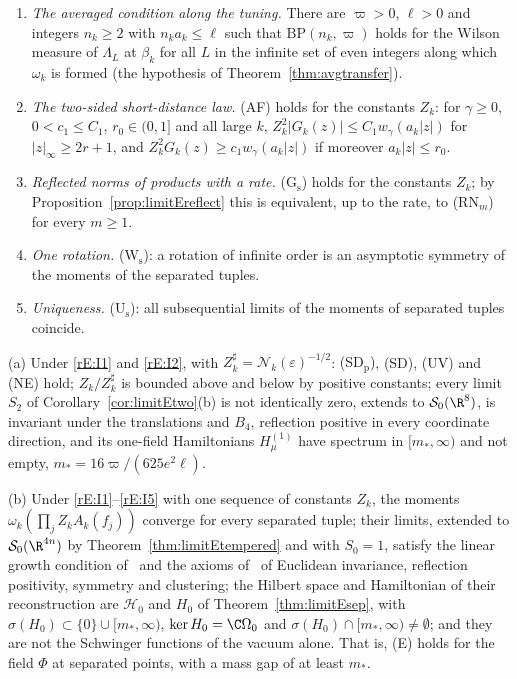 \begin{enumerate}[label=\textup{(I\arabic*)},leftmargin=*]
\item\label{rE:I1} \emph{The averaged condition along the tuning.} There
are $\varpi>0$, $\ell>0$ and integers $n_k\ge2$ with $n_ka_k\le\ell$ such
that $\mathrm{BP}(n_k,\varpi)$ holds for the Wilson measure of $\Lambda_L$
at $\beta_k$ for all $L$ in the infinite set of even integers along which
$\omega_k$ is formed (the hypothesis of Theorem~\ref{thm:avgtransfer}).
\item\label{rE:I2} \emph{The two-sided short-distance law.} (AF) holds for
the constants $Z_k$: for $\gamma\ge0$, $0<c_1\le C_1$, $r_0\in(0,1]$ and all
large $k$, $Z_k^2|G_k(z)|\le C_1w_\gamma(a_k|z|)$ for $|z|_\infty\ge2r+1$, and
$Z_k^2G_k(z)\ge c_1w_\gamma(a_k|z|)$ if moreover $a_k|z|\le r_0$.
\item\label{rE:I3} \emph{Reflected norms of products with a rate.}
(G$_{\mathrm s}$) holds for the constants $Z_k$; by
Proposition~\ref{prop:limitEreflect} this is equivalent, up to the rate, to
(RN$_m$) for every $m\ge1$.
\item\label{rE:I4} \emph{One rotation.} (W$_{\mathrm s}$): a rotation of
infinite order is an asymptotic symmetry of the moments of the separated
tuples.
\item\label{rE:I5} \emph{Uniqueness.} (U$_{\mathrm s}$): all subsequential
limits of the moments of separated tuples coincide.
\end{enumerate}

\begin{theorem}\label{rE:suffices}
\textup{(a)} Under \textup{\ref{rE:I1}} and \textup{\ref{rE:I2}}, with
$Z^\sharp_k=\mathcal N_k(\varepsilon)^{-1/2}$: \textup{(SD$_{\mathrm p}$)},
\textup{(SD)}, \textup{(UV)} and \textup{(NE)} hold; $Z_k/Z^\sharp_k$ is
bounded above and below by positive constants; every limit $S_2$ of
Corollary~\textup{\ref{cor:limitEtwo}(b)} is not identically zero, extends
to $\mathcal S_0(\R^8)$, is invariant under the translations and $B_4$,
reflection positive in every coordinate direction, and its one-field
Hamiltonians $H^{(1)}_\mu$ have spectrum in $[m_*,\infty)$ and not empty,
$m_*=16\varpi/(625e^2\ell)$.

\textup{(b)} Under \textup{\ref{rE:I1}}--\textup{\ref{rE:I5}} with one
sequence of constants $Z_k$, the moments $\omega_k(\prod_jZ_kA_k(f_j))$
converge for every separated tuple; their limits, extended to
$\mathcal S_0(\R^{4n})$ by Theorem~\textup{\ref{thm:limitEtempered}} and with
$S_0=1$, satisfy the linear growth condition of~\cite{OS75} and the axioms
of~\cite{OS73} of Euclidean invariance, reflection positivity, symmetry and
clustering; the Hilbert space and Hamiltonian of their reconstruction are
$\mathcal H_0$ and $H_0$ of Theorem~\textup{\ref{thm:limitEsep}}, with
$\sigma(H_0)\subset\{0\}\cup[m_*,\infty)$, $\ker H_0=\C\Omega_0$ and
$\sigma(H_0)\cap[m_*,\infty)\ne\emptyset$; and they are not the Schwinger
functions of the vacuum alone. That is, \textup{(E)} holds for the field
$\Phi$ at separated points, with a mass gap of at least $m_*$.
\end{theorem}

